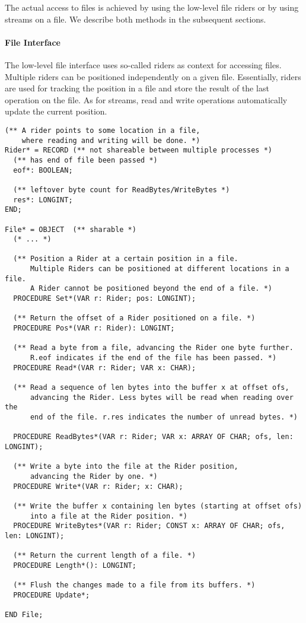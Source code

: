 \documentclass[a4paper,11pt]{article}
\begin{document}
The actual access to files is achieved by using the low-level file riders or by using streams on a file. We describe both methods in the subsequent sections.
\paragraph{File Interface}
The low-level file interface uses so-called riders as context for accessing files. Multiple riders can be positioned independently on a given file. Essentially, riders are used for tracking the position in a file and store the result of the last operation on the file. As for streams, read and write operations automatically update the current position.

\begin{lstlisting}[language=Oberon,frame=none,caption={Low-level Files API}]
(** A rider points to some location in a file,
    where reading and writing will be done. *)
Rider* = RECORD (** not shareable between multiple processes *)
  (** has end of file been passed *)
  eof*: BOOLEAN;

  (** leftover byte count for ReadBytes/WriteBytes *)
  res*: LONGINT;
END;

File* = OBJECT  (** sharable *)
  (* ... *)

  (** Position a Rider at a certain position in a file.
      Multiple Riders can be positioned at different locations in a file.
      A Rider cannot be positioned beyond the end of a file. *)
  PROCEDURE Set*(VAR r: Rider; pos: LONGINT);

  (** Return the offset of a Rider positioned on a file. *)
  PROCEDURE Pos*(VAR r: Rider): LONGINT;

  (** Read a byte from a file, advancing the Rider one byte further.
      R.eof indicates if the end of the file has been passed. *)
  PROCEDURE Read*(VAR r: Rider; VAR x: CHAR);

  (** Read a sequence of len bytes into the buffer x at offset ofs,
      advancing the Rider. Less bytes will be read when reading over the
      end of the file. r.res indicates the number of unread bytes. *)

  PROCEDURE ReadBytes*(VAR r: Rider; VAR x: ARRAY OF CHAR; ofs, len: LONGINT);

  (** Write a byte into the file at the Rider position,
      advancing the Rider by one. *)
  PROCEDURE Write*(VAR r: Rider; x: CHAR);

  (** Write the buffer x containing len bytes (starting at offset ofs)
      into a file at the Rider position. *)
  PROCEDURE WriteBytes*(VAR r: Rider; CONST x: ARRAY OF CHAR; ofs, len: LONGINT);

  (** Return the current length of a file. *)
  PROCEDURE Length*(): LONGINT;

  (** Flush the changes made to a file from its buffers. *)
  PROCEDURE Update*;

END File;
\end{lstlisting}
\end{document}
